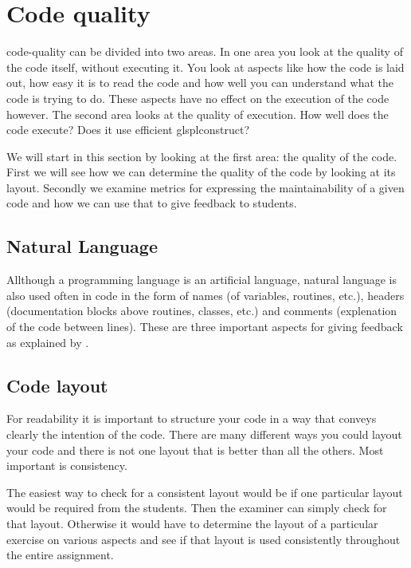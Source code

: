 \section{Code quality}

\Gls{code-quality} can be divided into two areas.
In one area you look at the quality of the \gls{code} itself,
without executing it.
You look at aspects like how the \gls{code} is laid out,
how easy it is to read the \gls{code}
and how well you can understand what the \gls{code} is trying to do.
These aspects have no effect on the execution of the \gls{code} however.
The second area looks at the quality of execution. How well
does the \gls{code} execute? Does it use efficient glspl{construct}?

We will start in this section by looking at the first area:
the quality of the \gls{code}.
First we will see how we can determine the quality of the \gls{code}
by looking at its layout.
Secondly we examine metrics for expressing the \gls{maintainability}
of a given \gls{code} and how we can use that
to give \gls{feedback} to \glspl{student}.

\subsection{Natural Language}

Allthough a programming language is an artificial language,
natural language is also used often in code in the form of
names (of variables, routines, etc.),
headers (documentation blocks above routines, classes, etc.)
and comments (explenation of the code between lines).
These are three important aspects for giving \gls{feedback}
as explained by \citet{stegeman2014empirically}.


\subsection{Code layout}

For readability it is important to structure your code in a way
that conveys clearly the intention of the code.
There are many different ways you could layout your code
and there is not one layout that is better than all the others.
Most important is consistency.

The easiest way to check for a consistent layout would be
if one particular layout would be required from the students.
Then the \gls{examiner} can simply check for that layout.
Otherwise it would have to determine the layout of a particular \gls{exercise}
on various aspects and see if that layout is used
consistently throughout the entire assignment.


